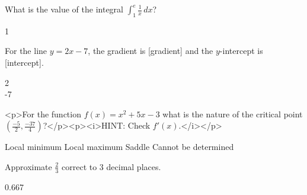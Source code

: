 \documentclass[12pt]{exam}
\begin{document}
\printanswers

\begin{questions}
	\question
	What is the value of the integral \(\displaystyle\int_{1}^{e}\frac{1}{x}\,dx\)?
	\begin{solution}
		1
	\end{solution}

	\question
	For the line \(y=2x-7\), the gradient is [gradient] and the \(y\)-intercept is [intercept].
	\begin{solution}
		2\\
		-7
	\end{solution}

	\question
	<p>For the function \(f(x)=x^{2}+5x-3\) what is the nature of the critical point \((\frac{-5}{2},\frac{-37}{4})\)?</p><p><i>HINT: Check \(f'(x)\).</i></p>
	\begin{solution}
		\begin{oneparchoices}
			\CorrectChoice Local minimum
			\choice Local maximum
			\choice Saddle
			\choice Cannot be determined
		\end{oneparchoices}
	\end{solution}

	\question
	Approximate \(\frac{2}{3}\) correct to \(3\) decimal places.
	\begin{solution}
		0.667
	\end{solution}
\end{questions}
\end{document}
